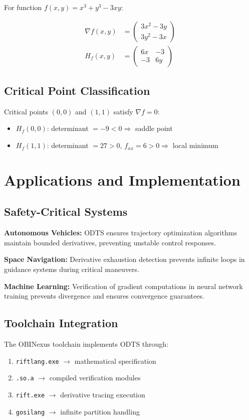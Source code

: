 \documentclass[12pt,a4paper]{article}
\begin{document}
For function $f(x,y) = x^3 + y^3 - 3xy$:

\begin{align}
\nabla f(x,y) &= \begin{pmatrix} 3x^2 - 3y \\ 3y^2 - 3x \end{pmatrix} \\
H_f(x,y) &= \begin{pmatrix} 6x & -3 \\ -3 & 6y \end{pmatrix}
\end{align}

\subsection{Critical Point Classification}

Critical points $(0,0)$ and $(1,1)$ satisfy $\nabla f = 0$:
\begin{itemize}
\item $H_f(0,0)$: determinant $= -9 < 0 \Rightarrow$ saddle point
\item $H_f(1,1)$: determinant $= 27 > 0$, $f_{xx} = 6 > 0 \Rightarrow$ local minimum
\end{itemize}

\section{Applications and Implementation}

\subsection{Safety-Critical Systems}

\textbf{Autonomous Vehicles:} ODTS ensures trajectory optimization algorithms maintain bounded derivatives, preventing unstable control responses.

\textbf{Space Navigation:} Derivative exhaustion detection prevents infinite loops in guidance systems during critical maneuvers.

\textbf{Machine Learning:} Verification of gradient computations in neural network training prevents divergence and ensures convergence guarantees.

\subsection{Toolchain Integration}

The OBINexus toolchain implements ODTS through:
\begin{enumerate}
\item \texttt{riftlang.exe} $\rightarrow$ mathematical specification
\item \texttt{.so.a} $\rightarrow$ compiled verification modules  
\item \texttt{rift.exe} $\rightarrow$ derivative tracing execution
\item \texttt{gosilang} $\rightarrow$ infinite partition handling
\end{enumerate}
\end{document}

